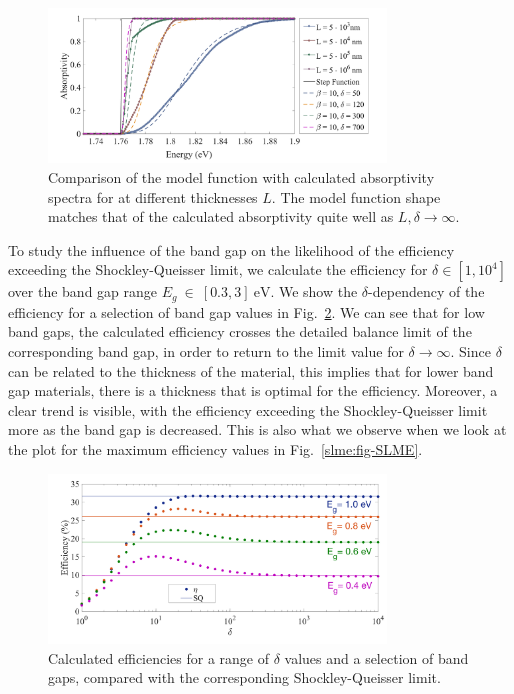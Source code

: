 \begin{refsection}
\begin{figure}[ht] 
\centering 
\includegraphics[width=0.8\textwidth]{Figures/slme/sq_Fig2.png} 
\caption{Comparison of the model function with calculated absorptivity spectra 
for  at different thicknesses $L$. The model function shape 
matches that of the calculated absorptivity quite well as $L,\delta 
\rightarrow \infty$.} 
\label{slme:fig-step} 
\end{figure} 
 
To study the influence of the band gap on the likelihood of the efficiency 
exceeding the Shockley-Queisser limit, we calculate the efficiency for $\delta 
\in [1, 10^4]$ over the band gap range $E_g~\in~[0.3, 3]~\si{\electronvolt}$. 
We show the $\delta$-dependency of the efficiency for a selection of band gap 
values in Fig.~\ref{slme:fig-deltadep}. We can see that for low band gaps, the 
calculated efficiency crosses the detailed balance limit of the corresponding 
band gap, in order to return to the limit value for $\delta \rightarrow 
\infty$. Since $\delta$ can be related to the thickness of the material, this 
implies that for lower band gap materials, there is a thickness that is 
optimal for the efficiency. Moreover, a clear trend is visible, with the 
efficiency exceeding the Shockley-Queisser limit more as the band gap is 
decreased. This is also what we observe when we look at the plot for the 
maximum efficiency values in Fig.~\ref{slme:fig-SLME}. 
 
\begin{figure}[ht] 
\centering 
\includegraphics[width=0.8\textwidth]{Figures/slme/sq_Fig3.png} 
\caption{Calculated efficiencies for a range of $\delta$ values and a 
selection of band gaps, compared with the corresponding Shockley-Queisser 
limit.} 
\label{slme:fig-deltadep} 
\end{figure} 
 

\end{refsection}
